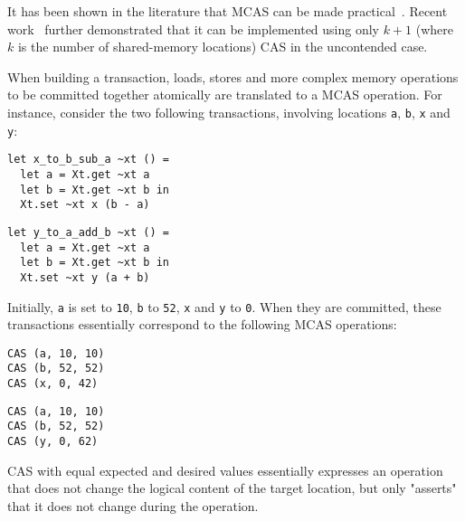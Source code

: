 It has been shown in the literature that MCAS can be made practical~\cite{DBLP:conf/wdag/HarrisFP02}.
Recent work~\cite{DBLP:conf/wdag/GuerraouiKMZ20} further demonstrated that it can be implemented using only $k + 1$ (where $k$ is the number of shared-memory locations) CAS in the uncontended case.

When building a transaction, loads, stores and more complex memory operations to be committed together atomically are translated to a MCAS operation.
For instance, consider the two following transactions, involving locations \texttt{a}, \texttt{b}, \texttt{x} and \texttt{y}:

\medskip
\begin{minipage}[t]{.45\textwidth}
\begin{verbatim}
let x_to_b_sub_a ~xt () =
  let a = Xt.get ~xt a
  let b = Xt.get ~xt b in
  Xt.set ~xt x (b - a)
\end{verbatim}
\end{minipage}
\hfill
\begin{minipage}[t]{.45\textwidth}
\begin{verbatim}
let y_to_a_add_b ~xt () =
  let a = Xt.get ~xt a
  let b = Xt.get ~xt b in
  Xt.set ~xt y (a + b)
\end{verbatim}
\end{minipage}
\medskip

Initially, \texttt{a} is set to \texttt{10}, \texttt{b} to \texttt{52}, \texttt{x} and \texttt{y} to \texttt{0}.
When they are committed, these transactions essentially correspond to the following MCAS operations:

\medskip
\begin{minipage}[t]{.45\textwidth}
\begin{verbatim}
CAS (a, 10, 10)
CAS (b, 52, 52)
CAS (x, 0, 42)
\end{verbatim}
\end{minipage}
\hfill
\begin{minipage}[t]{.45\textwidth}
\begin{verbatim}
CAS (a, 10, 10)
CAS (b, 52, 52)
CAS (y, 0, 62)
\end{verbatim}
\end{minipage}
\medskip

CAS with equal expected and desired values essentially expresses an operation that does not change the logical content of the target location, but only "asserts" that it does not change during the operation.

